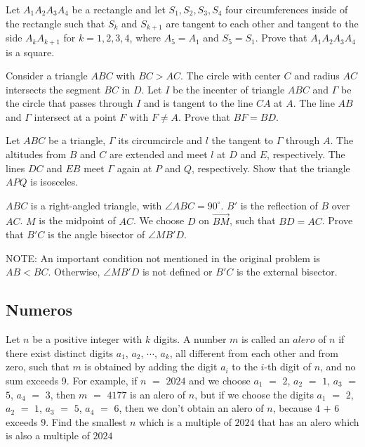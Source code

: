 \documentclass[11pt]{scrartcl}
\begin{document}
\begin{problem} [Centro 2022/4]
Let $A_1A_2A_3A_4$ be a rectangle and let $S_1,S_2,S_3,S_4$ four circumferences inside of the rectangle such that $S_k$ and $S_{k+1}$ are tangent to each other and tangent to the side $A_kA_{k+1}$ for $k=1,2,3,4$, where $A_5=A_1$ and $S_5=S_1$. Prove that $A_1A_2A_3A_4$ is a square.
\end{problem}

\begin{problem} [Centro 2020/4]
Consider a triangle $ABC$ with $BC>AC$. The circle with center $C$ and radius $AC$ intersects the segment $BC$ in $D$. Let $I$ be the incenter of triangle $ABC$ and $\Gamma$ be the circle that passes through $I$ and is tangent to the line $CA$ at $A$. The line $AB$ and $\Gamma$ intersect at a point $F$ with $F \neq A$. Prove that $BF=BD$.
\end{problem}

\begin{problem} [Centro 2019/4]
Let $ABC$ be a triangle, $\Gamma$ its circumcircle and $l$ the tangent to $\Gamma$ through $A$. The altitudes from $B$ and $C$ are extended and meet $l$ at $D$ and $E$, respectively. The lines $DC$ and $EB$ meet $\Gamma$ again at $P$ and $Q$, respectively. Show that the triangle $APQ$ is isosceles.
\end{problem}

\begin{problem}[Centro 2017/4]
$ABC$ is a right-angled triangle, with $\angle ABC = 90^{\circ}$. $B'$ is the reflection of $B$ over $AC$. $M$ is the midpoint of $AC$. We choose $D$ on $\overrightarrow{BM}$, such that $BD = AC$. Prove that $B'C$ is the angle bisector of $\angle MB'D$.

NOTE: An important condition not mentioned in the original problem is $AB<BC$. Otherwise, $\angle MB'D$ is not defined or $B'C$ is the external bisector.
\end{problem}

\subsection{Numeros}

\begin{problem} [Centro 2024/1]
	Let $n$ be a positive integer with $k$ digits. A number $m$ is called an $alero$ of $n$ if there exist distinct digits $a_1$, $a_2$, $\dotsb$, $a_k$, all different from each other and from zero, such that $m$ is obtained by adding the digit $a_i$ to the $i$-th digit of $n$, and no sum exceeds 9.
For example, if $n$ $=$ $2024$ and we choose $a_1$ $=$ $2$, $a_2$ $=$ $1$, $a_3$ $=$ $5$, $a_4$ $=$ $3$, then $m$ $=$ $4177$ is an alero of $n$, but if we choose the digits $a_1$ $=$ $2$, $a_2$ $=$ $1$, $a_3$ $=$ $5$, $a_4$ $=$ $6$, then we don't obtain an alero of $n$, because $4$ $+$ $6$ exceeds $9$.
Find the smallest $n$ which is a multiple of $2024$ that has an alero which is also a multiple of $2024$
\end{problem}
\end{document}
